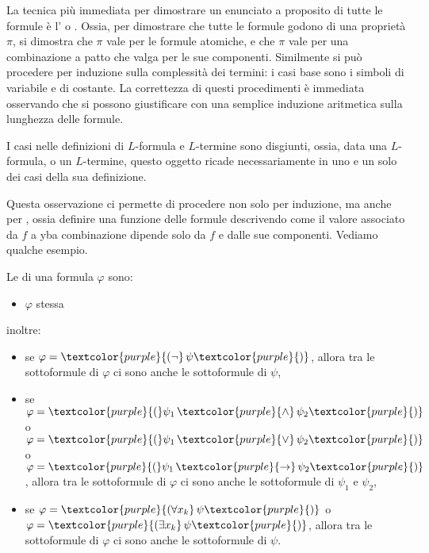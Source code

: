 La tecnica più immediata per dimostrare un enunciato a proposito di tutte le formule è l' o . Ossia, per dimostrare che tutte le formule godono di una proprietà $\pi$,
si dimostra che $\pi$ vale per le formule atomiche, e che $\pi$ vale per una combinazione a patto che valga per le sue componenti. Similmente si può procedere per induzione sulla complessità dei termini: i casi base sono i simboli di variabile e di costante.
La correttezza di questi procedimenti è immediata osservando che si possono giustificare con una semplice induzione aritmetica sulla lunghezza delle formule.

\begin{remark}
    I casi nelle definizioni di $L$-formula e $L$-termine sono disgiunti, ossia, data una $L$-formula, o un $L$-termine, questo oggetto ricade necessariamente in uno e un solo dei casi della sua definizione.
\end{remark}

Questa osservazione ci permette di procedere non solo per induzione, ma anche per , ossia definire una funzione delle formule descrivendo come il valore associato da $f$ a yba combinazione
dipende solo da $f$ e dalle sue componenti. Vediamo qualche esempio.

\begin{definition}
    [Sottoformula]
    Le  di una formula $\varphi$ sono:
    \begin{itemize}
        \item $\varphi$ stessa
    \end{itemize}
    inoltre:
    \begin{itemize}
        \item se $\varphi = \textcolor{purple}{(\neg}\, \psi \textcolor{purple}{)}$, allora tra le sottoformule di $\varphi$ ci sono anche le sottoformule di $\psi$,
        \item se $\varphi = \textcolor{purple}{(} \psi_1 \,\textcolor{purple}{\land} \,\psi_2 \textcolor{purple}{)}$ o $\varphi = \textcolor{purple}{(} \psi_1\, \textcolor{purple}{\lor}\, \psi_2 \textcolor{purple}{)}$ o
        $\varphi = \textcolor{purple}{(} \psi_1\, \textcolor{purple}{\to} \,\psi_2 \textcolor{purple}{)}$, allora tra le sottoformule di $\varphi$ ci sono anche le sottoformule di $\psi_1$ e $\psi_2$,
        \item se $\varphi = \textcolor{purple}{(\forall x_k} \,\psi \textcolor{purple}{)}$ o $\varphi = \textcolor{purple}{(\exists x_k}\, \psi \textcolor{purple}{)}$, allora tra le sottoformule di $\varphi$ ci sono anche le sottoformule di $\psi$.
    \end{itemize}
\end{definition}

